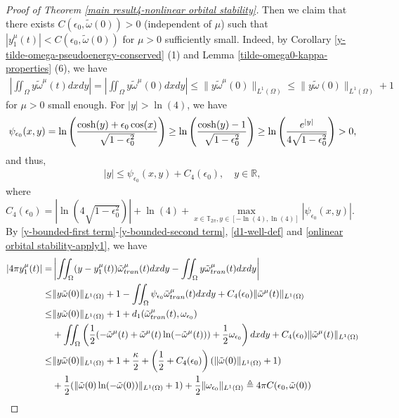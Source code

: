 \documentclass[1 [leqno, 11pt]{amsart}
\numberwithin{equation}{section}
\let\ep=\epsilon
\begin{document}
\begin{CJK*}{GBK}{song}
\begin{proof}[Proof of  Theorem \ref{main result4-nonlinear orbital stability}]
Then we claim  that there exists $C(\ep_0,\tilde\omega(0))>0$ (independent of $\mu$) such that  $|y_1^\mu(t)|<C(\ep_0,\tilde\omega(0))$ for $\mu>0$ sufficiently small. Indeed,
by Corollary \ref{y-tilde-omega-pseudoenergy-conserved} (1) and Lemma \ref{tilde-omega0-kappa-properties} (6), we have
\begin{align}\label{y-bounded-first term}
\left|\iint_\Omega y\tilde\omega^\mu(t)dxdy\right|=\left|\iint_\Omega y\tilde\omega^\mu(0)dxdy\right|\leq\|y\tilde\omega^\mu(0)\|_{L^1(\Omega)}\leq \|y\tilde\omega(0)\|_{L^1(\Omega)}+1
\end{align}
 for $\mu>0$ small enough. For $|y|>\ln(4)$, we have
 \begin{align*}
 \psi_{\ep_0}(x,y)= \ln \left(\frac{\cosh (y) + \epsilon_0 \cos (x)}{\sqrt{1-\epsilon_0^2}} \right)\geq\ln \left(\frac{\cosh (y) -1}{\sqrt{1-\epsilon_0^2}} \right)\geq\ln \left({e^{|y|}\over4\sqrt{1-\epsilon_0^2}} \right)>0,
\end{align*}
and thus,
\begin{align}\label{y-bounded-second term}
|y|\leq \psi_{\ep_0}(x,y)+C_4(\ep_0), \quad y\in \mathbb{R},
\end{align}
where $C_4(\ep_0)=\left|\ln\left(4\sqrt{1-\epsilon_0^2}\right)\right|+\ln(4)+\max\limits_{x\in\mathbb{T}_{2\pi},y\in[-\ln(4),\ln(4)]}|\psi_{\ep_0}(x,y)|$.
By \eqref{y-bounded-first term}-\eqref{y-bounded-second term}, \eqref{d1-well-def} and \eqref{onlinear orbital stability-apply1}, we have
\begin{align}\nonumber
|4\pi y_1^\mu(t)|=&\left|\iint_\Omega(y-y_1^\mu(t))\tilde\omega_{tran}^\mu(t)dxdy-\iint_\Omega y\tilde\omega_{tran}^\mu(t)dxdy\right|\\\nonumber
\leq&\|y\tilde\omega(0)\|_{L^1(\Omega)}+1-\iint_\Omega\psi_{\ep_0}\tilde\omega_{tran}^\mu(t)dxdy
+C_4(\ep_0)\|\tilde\omega^\mu(t)\|_{L^1(\Omega)}\\\nonumber
\leq&\|y\tilde\omega(0)\|_{L^1(\Omega)}+1+
d_1(\tilde \omega_{tran}^\mu(t),\omega_{\ep_0})\\\nonumber
&+\iint_{\Omega}\left({1\over2}(-\tilde \omega^\mu(t)+\tilde \omega^\mu(t)\ln(-\tilde \omega^\mu(t)))+{1\over 2}\omega_{\ep_0} \right) dxdy+C_4(\ep_0)\|\tilde\omega^\mu(t)\|_{L^1(\Omega)}\\\nonumber
\leq&\|y\tilde\omega(0)\|_{L^1(\Omega)}+1+{\kappa\over2}+\left({1\over2}+C_4(\ep_0)\right)(\|\tilde\omega(0)\|_{L^1(\Omega)}+1)\\\nonumber
&+{1\over2}(\|\tilde \omega(0)\ln(-\tilde \omega(0))\|_{L^1(\Omega)}+1)+{1\over2}\|\omega_{\ep_0}\|_{L^1(\Omega)}\triangleq 4\pi C(\ep_0,\tilde\omega(0))

\end{align}
\end{proof}
\end{CJK*}
\end{document}
